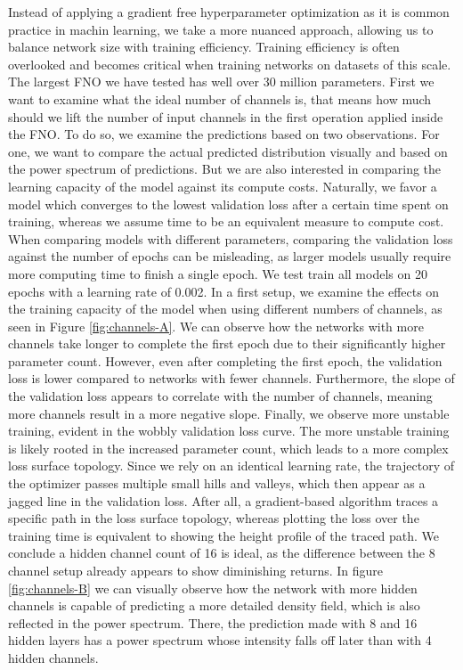 \documentclass{article}
\begin{document}
Instead of applying a gradient free hyperparameter optimization as it is common practice in machin learning, we take a more nuanced approach, allowing us to balance network size with training efficiency. Training efficiency is often overlooked and becomes critical when training networks on datasets of this scale. The largest FNO we have tested has well over 30 million parameters. First we want to examine what the ideal number of channels is, that means how much should we lift the number of input channels in the first operation applied inside the FNO. To do so, we examine the predictions based on two observations. For one, we want to compare the actual predicted distribution visually and based on the power spectrum of predictions. But we are also interested in comparing the learning capacity of the model against its compute costs. Naturally, we favor a model which converges to the lowest validation loss after a certain time spent on training, whereas we assume time to be an equivalent measure to compute cost. When comparing models with different parameters, comparing the validation loss against the number of epochs can be misleading, as larger models usually require more computing time to finish a single epoch. We test train all models on 20 epochs with a learning rate of 0.002. In a first setup, we examine the effects on the training capacity of the model when using different numbers of channels, as seen in Figure \ref{fig:channels-A}. We can observe how the networks with more channels take longer to complete the first epoch due to their significantly higher parameter count. However, even after completing the first epoch, the validation loss is lower compared to networks with fewer channels. Furthermore, the slope of the validation loss appears to correlate with the number of channels, meaning more channels result in a more negative slope. Finally, we observe more unstable training, evident in the wobbly validation loss curve. The more unstable training is likely rooted in the increased parameter count, which leads to a more complex loss surface topology. Since we rely on an identical learning rate, the trajectory of the optimizer passes multiple small hills and valleys, which then appear as a jagged line in the validation loss. After all, a gradient-based algorithm traces a specific path in the loss surface topology, whereas plotting the loss over the training time is equivalent to showing the height profile of the traced path. We conclude a hidden channel count of 16 is ideal, as the difference between the 8 channel setup already appears to show diminishing returns. In figure \ref{fig:channels-B} we can visually observe how the network with more hidden channels is capable of predicting a more detailed density field, which is also reflected in the power spectrum. There, the prediction made with 8 and 16 hidden layers has a power spectrum whose intensity falls off later than with 4 hidden channels.
\end{document}
